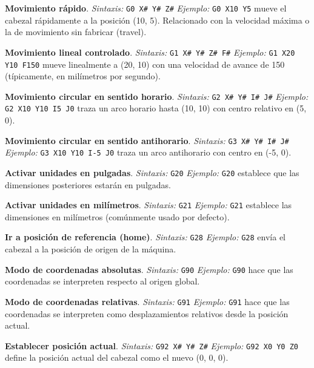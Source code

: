 \begin{description}[leftmargin=1.5cm, style=nextline]

\item[G0] \textbf{Movimiento rápido}.  
\textit{Sintaxis:} \texttt{G0 X\# Y\# Z\#}  
\textit{Ejemplo:} \texttt{G0 X10 Y5} mueve el cabezal rápidamente a la posición (10, 5). Relacionado con la velocidad máxima o la de movimiento sin fabricar (travel). 

\item[G1] \textbf{Movimiento lineal controlado}.  
\textit{Sintaxis:} \texttt{G1 X\# Y\# Z\# F\#}  
\textit{Ejemplo:} \texttt{G1 X20 Y10 F150} mueve linealmente a (20, 10) con una velocidad de avance de 150 (típicamente, en milímetros por segundo).  

\item[G2] \textbf{Movimiento circular en sentido horario}.  
\textit{Sintaxis:} \texttt{G2 X\# Y\# I\# J\#}  
\textit{Ejemplo:} \texttt{G2 X10 Y10 I5 J0} traza un arco horario hasta (10, 10) con centro relativo en (5, 0).  

\item[G3] \textbf{Movimiento circular en sentido antihorario}.  
\textit{Sintaxis:} \texttt{G3 X\# Y\# I\# J\#}  
\textit{Ejemplo:} \texttt{G3 X10 Y10 I-5 J0} traza un arco antihorario con centro en (-5, 0).  

\item[G20] \textbf{Activar unidades en pulgadas}.  
\textit{Sintaxis:} \texttt{G20}  
\textit{Ejemplo:} \texttt{G20} establece que las dimensiones posteriores estarán en pulgadas.  

\item[G21] \textbf{Activar unidades en milímetros}.  
\textit{Sintaxis:} \texttt{G21}  
\textit{Ejemplo:} \texttt{G21} establece las dimensiones en milímetros (comúnmente usado por defecto).  

\item[G28] \textbf{Ir a posición de referencia (home)}.  
\textit{Sintaxis:} \texttt{G28}  
\textit{Ejemplo:} \texttt{G28} envía el cabezal a la posición de origen de la máquina.  

\item[G90] \textbf{Modo de coordenadas absolutas}.  
\textit{Sintaxis:} \texttt{G90}  
\textit{Ejemplo:} \texttt{G90} hace que las coordenadas se interpreten respecto al origen global.  

\item[G91] \textbf{Modo de coordenadas relativas}.  
\textit{Sintaxis:} \texttt{G91}  
\textit{Ejemplo:} \texttt{G91} hace que las coordenadas se interpreten como desplazamientos relativos desde la posición actual.  

\item[G92] \textbf{Establecer posición actual}.  
\textit{Sintaxis:} \texttt{G92 X\# Y\# Z\#}  
\textit{Ejemplo:} \texttt{G92 X0 Y0 Z0} define la posición actual del cabezal como el nuevo (0, 0, 0).  


\end{description}

